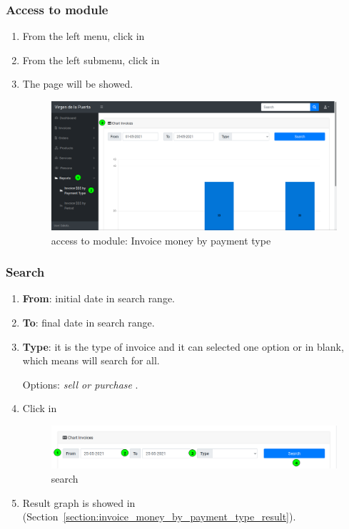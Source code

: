 \documentclass[a4paper,11pt]{refart}
\begin{document}
\subsubsection{Access to module}
\begin{enumerate}
	\item From the left menu, click in  
	\item From the left submenu, click in 
	\item The page will be showed.
	\begin{figure}[H]\centering
		\includegraphics[width=\textwidth]{images/report_invoice_by_payment_type-access.png}
		\caption{access to module: Invoice money by payment type}
		\label{fig:report_invoice_by_payment_type-access}
	\end{figure}
\end{enumerate}

\subsubsection{Search}\label{section:invoice_money_by_payment_type_search}
\begin{enumerate}
	\item \textbf{From}: initial date in search range.
	\item \textbf{To}: final date in search range.
	\item \textbf{Type}: it is the type of invoice and it can selected one option or in blank, which means will search for all.
		\medskip
		\begin{leftbar}
			Options: \emph{sell or purchase} .
		\end{leftbar}
	\item Click in 
	\begin{figure}[H]\centering
		\includegraphics[width=\textwidth]{images/report_invoice_by_payment_type-search.png}
		\caption{search}
		\label{fig:report_invoice_by_payment_type-search}
	\end{figure}
	\item Result graph is showed in (Section~\ref{section:invoice_money_by_payment_type_result}).
\end{enumerate}
\end{document}
